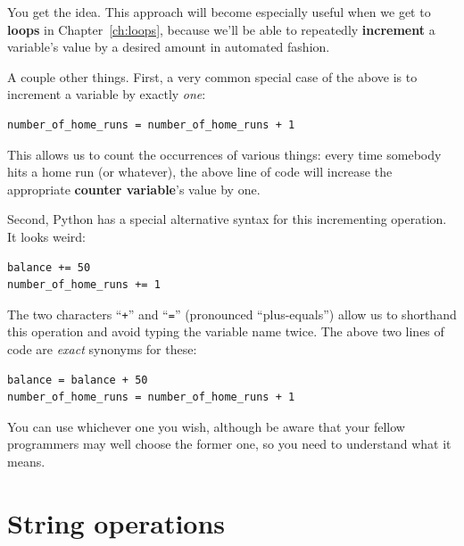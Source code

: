 You get the idea. This approach will become especially useful when we get to
\textbf{loops} in Chapter~\ref{ch:loops}, because we'll be able to repeatedly
\textbf{increment} a variable's value by a desired amount in automated fashion.

\medskip

A couple other things. First, a very common special case of the above is to
increment a variable by exactly \textit{one}:

\vspace{-.15in}
\begin{Verbatim}[fontsize=\small,samepage=true,frame=single,framesep=3mm]
number_of_home_runs = number_of_home_runs + 1
\end{Verbatim}
\vspace{-.15in}

This allows us to count the occurrences of various things: every time somebody
hits a home run (or whatever), the above line of code will increase the
appropriate \textbf{counter variable}'s value by one.

\smallskip

Second, Python has a special alternative syntax for this incrementing
operation. It looks weird:

\vspace{-.15in}
\begin{Verbatim}[fontsize=\small,samepage=true,frame=single,framesep=3mm]
balance += 50
number_of_home_runs += 1
\end{Verbatim}

The two characters ``\texttt{+}'' and ``\texttt{=}'' (pronounced
``plus-equals'') allow us to shorthand this operation and avoid typing the
variable name twice. The above two lines of code are \textit{exact} synonyms
for these:

\vspace{-.15in}
\begin{Verbatim}[fontsize=\small,samepage=true,frame=single,framesep=3mm]
balance = balance + 50
number_of_home_runs = number_of_home_runs + 1
\end{Verbatim}

You can use whichever one you wish, although be aware that your fellow
programmers may well choose the former one, so you need to understand what it
means.

\section{String operations}

